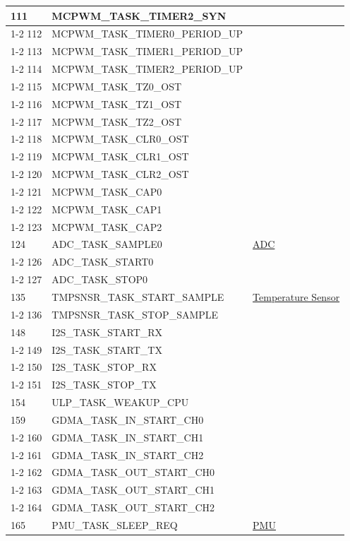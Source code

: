 \documentclass[main\_\_EN.tex]{subfiles}
\begin{document}
\begin{longtable}{ | l | l | l | }
111 & MCPWM\_TASK\_TIMER2\_SYN & \\ \cline{1-2}
112 & MCPWM\_TASK\_TIMER0\_PERIOD\_UP      & \\ \cline{1-2}
113 & MCPWM\_TASK\_TIMER1\_PERIOD\_UP      & \\ \cline{1-2}
114 & MCPWM\_TASK\_TIMER2\_PERIOD\_UP      & \\ \cline{1-2}
115 & MCPWM\_TASK\_TZ0\_OST  & \\ \cline{1-2}
116 & MCPWM\_TASK\_TZ1\_OST  & \\ \cline{1-2}
117 & MCPWM\_TASK\_TZ2\_OST  & \\ \cline{1-2}
118 & MCPWM\_TASK\_CLR0\_OST & \\ \cline{1-2}
119 & MCPWM\_TASK\_CLR1\_OST & \\ \cline{1-2}
120 & MCPWM\_TASK\_CLR2\_OST & \\ \cline{1-2}
121 & MCPWM\_TASK\_CAP0      & \\ \cline{1-2}
122 & MCPWM\_TASK\_CAP1      & \\ \cline{1-2}
123 & MCPWM\_TASK\_CAP2      & \\ \hline
124 & ADC\_TASK\_SAMPLE0     & \hyperref[mod:sensor]{ADC}   \\ \cline{1-2}
126 & ADC\_TASK\_START0      & \\ \cline{1-2}
127 & ADC\_TASK\_STOP0& \\ \hline
135 & TMPSNSR\_TASK\_START\_SAMPLE  & \hyperref[mod:sensor]{Temperature Sensor}      \\ \cline{1-2}
136 & TMPSNSR\_TASK\_STOP\_SAMPLE   & \\ \hline
148 & I2S\_TASK\_START\_RX   & \nameref{mod:i2s}   \\ \cline{1-2}
149 & I2S\_TASK\_START\_TX   & \\ \cline{1-2}
150 & I2S\_TASK\_STOP\_RX    & \\ \cline{1-2}
151 & I2S\_TASK\_STOP\_TX    & \\ \hline
154 & ULP\_TASK\_WEAKUP\_CPU & \nameref{mod:ulp} \\ \hline
159 & GDMA\_TASK\_IN\_START\_CH0    & \nameref{mod:dma}  \\ \cline{1-2}
160 & GDMA\_TASK\_IN\_START\_CH1    & \\ \cline{1-2}
161 & GDMA\_TASK\_IN\_START\_CH2    & \\ \cline{1-2}
162 & GDMA\_TASK\_OUT\_START\_CH0   & \\ \cline{1-2}
163 & GDMA\_TASK\_OUT\_START\_CH1   & \\ \cline{1-2}
164 & GDMA\_TASK\_OUT\_START\_CH2   & \\ \hline
165 & PMU\_TASK\_SLEEP\_REQ  & \hyperref[mod:lowpowm]{PMU} \\ \hline
\end{longtable}
\end{document}
